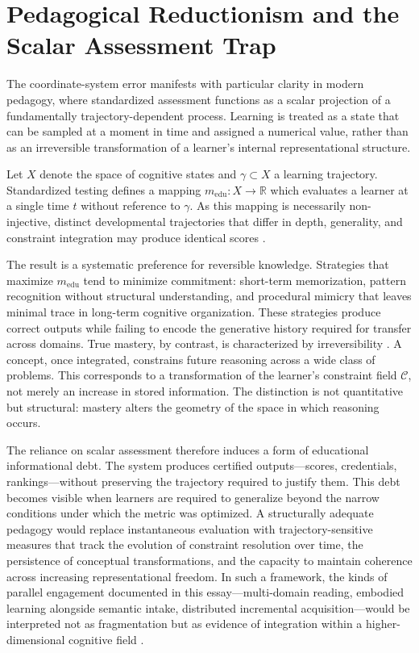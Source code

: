 \documentclass[12pt, a4paper]{article}
\begin{document}
\section{Pedagogical Reductionism and the Scalar Assessment Trap}

The coordinate-system error manifests with particular clarity in modern pedagogy, where standardized assessment functions as a scalar projection of a fundamentally trajectory-dependent process. Learning is treated as a state that can be sampled at a moment in time and assigned a numerical value, rather than as an irreversible transformation of a learner's internal representational structure.

Let $X$ denote the space of cognitive states and $\gamma \subset X$ a learning trajectory. Standardized testing defines a mapping $m_{\mathrm{edu}} \colon X \to \mathbb{R}$ which evaluates a learner at a single time $t$ without reference to $\gamma$. As this mapping is necessarily non-injective, distinct developmental trajectories that differ in depth, generality, and constraint integration may produce identical scores \cite{Simon1969}.

The result is a systematic preference for reversible knowledge. Strategies that maximize $m_{\mathrm{edu}}$ tend to minimize commitment: short-term memorization, pattern recognition without structural understanding, and procedural mimicry that leaves minimal trace in long-term cognitive organization. These strategies produce correct outputs while failing to encode the generative history required for transfer across domains. True mastery, by contrast, is characterized by irreversibility \cite{Landauer1961}. A concept, once integrated, constrains future reasoning across a wide class of problems. This corresponds to a transformation of the learner's constraint field $\mathcal{C}$, not merely an increase in stored information. The distinction is not quantitative but structural: mastery alters the geometry of the space in which reasoning occurs.

The reliance on scalar assessment therefore induces a form of educational informational debt. The system produces certified outputs---scores, credentials, rankings---without preserving the trajectory required to justify them. This debt becomes visible when learners are required to generalize beyond the narrow conditions under which the metric was optimized. A structurally adequate pedagogy would replace instantaneous evaluation with trajectory-sensitive measures that track the evolution of constraint resolution over time, the persistence of conceptual transformations, and the capacity to maintain coherence across increasing representational freedom. In such a framework, the kinds of parallel engagement documented in this essay---multi-domain reading, embodied learning alongside semantic intake, distributed incremental acquisition---would be interpreted not as fragmentation but as evidence of integration within a higher-dimensional cognitive field \cite{Hutchins1995}.
\end{document}
